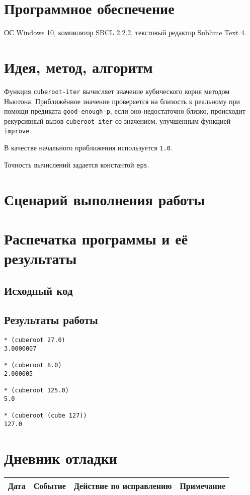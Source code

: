 \documentclass[12pt]{article}
\begin{document}
\section{Программное обеспечение}
ОС Windows 10, компилятор SBCL 2.2.2, текстовый редактор Sublime Text 4.

\section{Идея, метод, алгоритм}
Функция {\tt cuberoot-iter} вычисляет значение кубического корня методом Ньютона. Приближённое значение проверяется на близость к реальному при помощи предиката {\tt good-enough-p}, если оно недостаточно близко, происходит рекурсивный вызов {\tt cuberoot-iter} со значением, улучшенным функцией {\tt improve}.

В качестве начального приближения используется {\tt 1.0}.

Точность вычислений задается константой {\tt eps}.

\section{Сценарий выполнения работы}

\section{Распечатка программы и её результаты}

\subsection{Исходный код}


\subsection{Результаты работы}
\begin{lstlisting}
* (cuberoot 27.0)
3.0000007

* (cuberoot 8.0)
2.000005

* (cuberoot 125.0)
5.0

* (cuberoot (cube 127))
127.0
\end{lstlisting}

\section{Дневник отладки}
\begin{tabular}{|c|c|c|c|}
\hline
Дата & Событие & Действие по исправлению & Примечание \\
\hline
\end{tabular}
\end{document}
